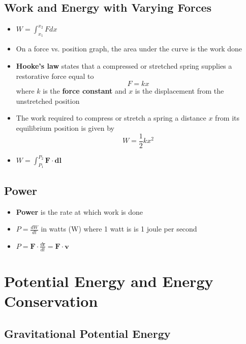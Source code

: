 \documentclass{article}
\begin{document}
\subsection{Work and Energy with Varying Forces}

\begin{itemize}
  \item $W=\int_{x_1}^{x_2}F dx$

  \item On a force vs. position graph, the area under the curve is the work done

  \item \textbf{Hooke's law} states that a compressed or stretched spring supplies a restorative force equal to \[F=kx\] where $k$ is the \textbf{force constant} and $x$ is the displacement from the unstretched position

  \item The work required to compress or stretch a spring a distance $x$ from its equilibrium position is given by \[W=\frac{1}{2}kx^2\]

  \item $W=\int_{P_1}^{P_2}\textbf{F}\cdot\textbf{dl}$
\end{itemize}

\subsection{Power}

\begin{itemize}
  \item \textbf{Power} is the rate at which work is done

  \item $P=\frac{dW}{dt}$ in watts (W) where 1 watt is is 1 joule per second

  \item $P=\mathbf{F}\cdot\frac{d\mathbf{r}}{dt}=\mathbf{F}\cdot\mathbf{v}$
\end{itemize}

\section{Potential Energy and Energy Conservation}

\subsection{Gravitational Potential Energy}
\end{document}
